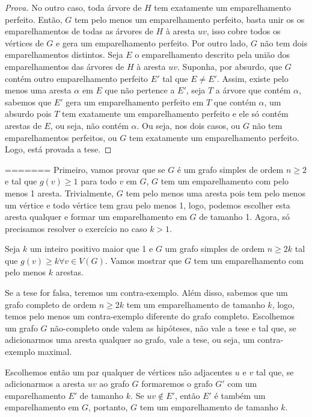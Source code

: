 \documentclass[12pt]{article}
\begin{document}
\begin{proof}[Prova]
No outro caso, toda árvore de $H$ tem exatamente um emparelhamento perfeito. Então, $G$ tem pelo menos um emparelhamento perfeito, basta unir os os emparelhamentos de todas as árvores de $H$ à aresta $uv$, isso cobre todos os vértices de $G$ e gera um emparelhamento perfeito. Por outro lado, $G$ não tem dois emparelhamentos distintos. Seja $E$ o emparelhamento descrito pela união dos emparelhamentos das árvores de $H$ à aresta $uv$. Suponha, por absurdo, que $G$ contém outro emparelhamento perfeito $E'$ tal que $E \neq E'$. Assim, existe pelo menos uma aresta $\alpha$ em $E$ que não pertence a $E'$, seja $T$ a árvore que contém $\alpha$, sabemos que $E'$ gera um emparelhamento perfeito em $T$ que contém $\alpha$, um absurdo pois $T$ tem exatamente um emparelhamento perfeito e ele só contém arestas de $E$, ou seja, não contém $\alpha$.
Ou seja, nos dois casos, ou $G$ não tem emparelhamentos perfeitos, ou $G$ tem exatamente um emparelhamento perfeito. Logo, está provada a tese.
\end{proof}
=======
Primeiro, vamos provar que se $G$ é um grafo simples de ordem $n \geq 2$ e tal que $g(v) \geq 1$ para todo $v$ em $G$, $G$ tem um emparelhamento com pelo menos 1 aresta. Trivialmente, $G$ tem pelo menos uma aresta pois tem pelo menos um vértice e todo vértice tem grau pelo menos 1, logo, podemos escolher esta aresta qualquer e formar um emparelhamento em $G$ de tamanho 1. Agora, só precisamos resolver o exercício no caso $k > 1$.

Seja $k$ um inteiro positivo maior que  1 e $G$ um grafo simples de ordem $n \geq 2k$ tal que $g(v) \geq k \forall v \in V(G)$. Vamos mostrar que $G$ tem um emparelhamento com pelo menos $k$ arestas.

Se a tese for falsa, teremos um contra-exemplo. Além disso, sabemos que um grafo completo de ordem $n \geq 2k$ tem um emparelhamento de tamanho $k$, logo, temos pelo menos um contra-exemplo diferente do grafo completo. Escolhemos um grafo $G$ não-completo onde valem as hipóteses, não vale a tese e tal que, se adicionarmos uma aresta qualquer ao grafo, vale a tese, ou seja, um contra-exemplo maximal.

Escolhemos então um par qualquer de vértices não adjacentes $u$ e $v$ tal que, se adicionarmos a aresta $uv$ ao grafo $G$ formaremos o grafo $G'$ com um emparelhamento $E'$ de tamanho $k$. Se $uv \notin E'$, então $E'$ é também um emparelhamento em $G$, portanto, $G$ tem um emparelhamento de tamanho $k$.
\end{document}
